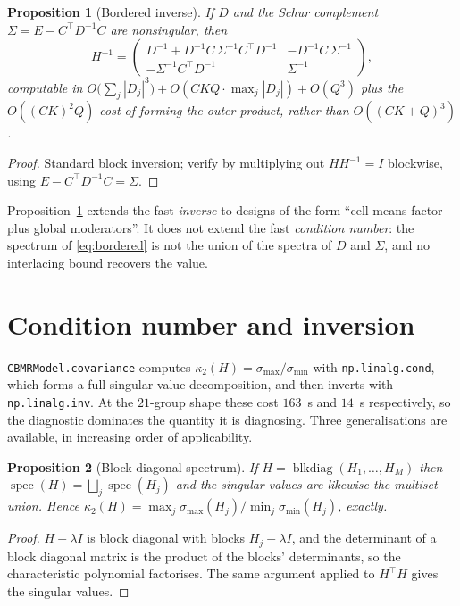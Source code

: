 \documentclass[11pt,a4paper]{article}
\theoremstyle{plain}
\newtheorem{proposition}{Proposition}
\theoremstyle{definition}
\newcommand{\spec}{\operatorname{spec}}
\newcommand{\cond}{\kappa}
\begin{document}
\begin{proposition}[Bordered inverse]\label{prop:schur}
If $D$ and the Schur complement $\Sigma = E - C^\top D^{-1}C$ are nonsingular, then
\begin{equation}
  H^{-1} =
  \begin{pmatrix}
    D^{-1} + D^{-1}C\,\Sigma^{-1}C^\top D^{-1} & -D^{-1}C\,\Sigma^{-1}\\[2pt]
    -\Sigma^{-1}C^\top D^{-1} & \Sigma^{-1}
  \end{pmatrix},
\end{equation}
computable in $O\bigl(\sum_j |D_j|^3\bigr) + O(CKQ\cdot\max_j|D_j|) + O(Q^3)$ plus the
$O((CK)^2Q)$ cost of forming the outer product, rather than $O((CK+Q)^3)$.
\end{proposition}

\begin{proof}
Standard block inversion; verify by multiplying out $H H^{-1} = I$ blockwise, using
$E - C^\top D^{-1} C = \Sigma$.
\end{proof}

Proposition~\ref{prop:schur} extends the fast \emph{inverse} to designs of the form
``cell-means factor plus global moderators''. It does not extend the fast \emph{condition
number}: the spectrum of \eqref{eq:bordered} is not the union of the spectra of $D$ and
$\Sigma$, and no interlacing bound recovers the value.

\section{Condition number and inversion}

\texttt{CBMRModel.covariance} computes $\cond_2(H) = \sigma_{\max}/\sigma_{\min}$ with
\texttt{np.linalg.cond}, which forms a full singular value decomposition, and then inverts with
\texttt{np.linalg.inv}. At the $21$-group shape these cost $163$~s and $14$~s respectively, so
the diagnostic dominates the quantity it is diagnosing. Three generalisations are available, in
increasing order of applicability.

\begin{proposition}[Block-diagonal spectrum]\label{prop:spectrum}
If $H = \operatorname{blkdiag}(H_1,\dots,H_M)$ then
$\spec(H) = \bigsqcup_j \spec(H_j)$ and the
singular values are likewise the multiset union. Hence
$\cond_2(H) = \max_j\sigma_{\max}(H_j) \big/ \min_j \sigma_{\min}(H_j)$, exactly.
\end{proposition}

\begin{proof}
$H - \lambda I$ is block diagonal with blocks $H_j - \lambda I$, and the determinant of a block
diagonal matrix is the product of the blocks' determinants, so the characteristic polynomial
factorises. The same argument applied to $H^\top H$ gives the singular values.
\end{proof}
\end{document}
